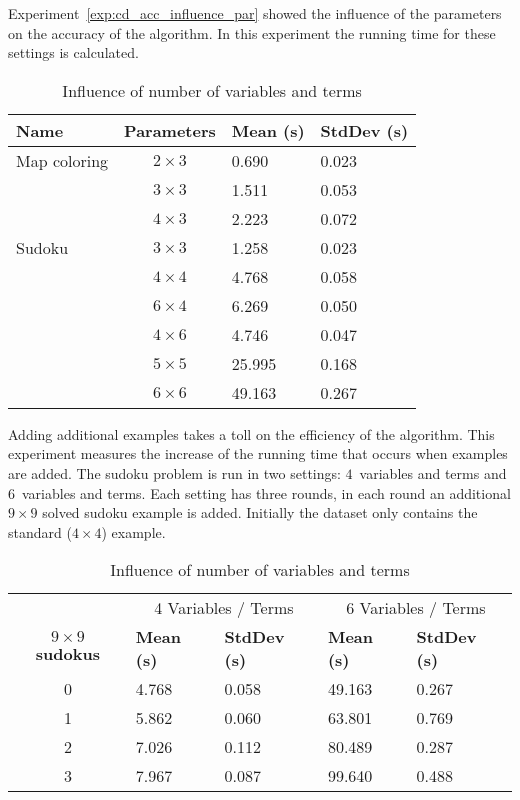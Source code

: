 \begin{experiment}
	Experiment~\ref{exp:cd_acc_influence_par} showed the influence of the parameters on the accuracy of the algorithm.
	In this experiment the running time for these settings is calculated.

	\begin{table}[!htp]
		\begin{tabularx}{\textwidth}{lc|XX}
			\textbf{Name}	& \textbf{Parameters}	& \textbf{Mean (s)}	& \textbf{StdDev (s)} \\
			\toprule
			Map coloring 	& $2 \times 3$ 			& 0.690				& 0.023	\\
							& $3 \times 3$ 			& 1.511				& 0.053	\\
							& $4 \times 3$ 			& 2.223				& 0.072	\\
			\midrule	
			Sudoku 			& $3 \times 3$ 			& 1.258				& 0.023	\\
							& $4 \times 4$ 			& 4.768				& 0.058	\\
							& $6 \times 4$ 			& 6.269				& 0.050	\\
							& $4 \times 6$ 			& 4.746				& 0.047	\\
							& $5 \times 5$ 			& 25.995			& 0.168	\\
							& $6 \times 6$ 			& 49.163			& 0.267
		\end{tabularx}
		\label{tbl:cd_speed_influence}
		\caption{Influence of number of variables and terms}
	\end{table}

\end{experiment}

\begin{experiment}
	Adding additional examples takes a toll on the efficiency of the algorithm.
	This experiment measures the increase of the running time that occurs when examples are added.
	The sudoku problem is run in two settings: $4$~variables and terms and $6$~variables and terms.
	Each setting has three rounds, in each round an additional $9 \times 9$ solved sudoku example is added.
	Initially the dataset only contains the standard ($4 \times 4$) example.

	\begin{table}[!htp]
		\begin{tabularx}{\textwidth}{c|XX|XX}
											& \multicolumn{2}{c}{4 Variables / Terms} & \multicolumn{2}{c}{6 Variables / Terms} \\
			\textbf{$9 \times 9$ sudokus}	& \textbf{Mean (s)} & \textbf{StdDev (s)} & \textbf{Mean (s)} & \textbf{StdDev (s)} \\
			\toprule
			0 & 4.768 & 0.058	& 49.163	& 0.267	\\
			1 & 5.862 & 0.060	& 63.801	& 0.769	\\
			2 & 7.026 & 0.112	& 80.489	& 0.287	\\
			3 & 7.967 & 0.087	& 99.640	& 0.488	\\
		\end{tabularx}
		\label{tbl:cd_speed_examples}
		\caption{Influence of number of variables and terms}
	\end{table}
\end{experiment}


